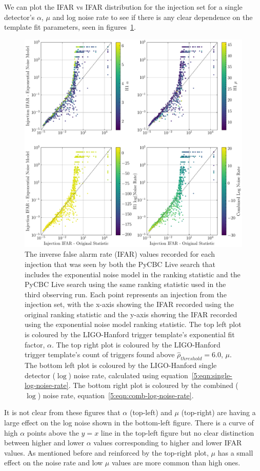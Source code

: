 We can plot the IFAR vs IFAR distribution for the injection set for a single detector's $\alpha$, $\mu$ and log noise rate to see if there is any clear dependence on the template fit parameters, seen in figures~\ref{5:fig:ifar-ifar-subplots}.
%
\begin{figure}
    \centering
    \includegraphics[width=\textwidth]{images/5_pycbclive/fits-only/fits_only_ifar_vs_ifar_subplots.pdf}
    \caption{The inverse false alarm rate (IFAR) values recorded for each injection that was seen by both the PyCBC Live search that includes the exponential noise model in the ranking statistic and the PyCBC Live search using the same ranking statistic used in the third observing run. Each point represents an injection from the injection set, with the x-axis showing the IFAR recorded using the original ranking statistic and the y-axis showing the IFAR recorded using the exponential noise model ranking statistic. The top left plot is coloured by the LIGO-Hanford trigger template's exponential fit factor, $\alpha$. The top right plot is coloured by the LIGO-Hanford trigger template's count of triggers found above $\hat{\rho}_{threshold} = 6.0$, $\mu$. The bottom left plot is coloured by the LIGO-Hanford single detector ($\log$) noise rate, calculated using equation~\ref{5:eqn:single-log-noise-rate}. The bottom right plot is coloured by the combined ($\log$) noise rate, equation~\ref{5:eqn:comb-log-noise-rate}.}
    \label{5:fig:ifar-ifar-subplots}
\end{figure}
%
It is not clear from these figures that $\alpha$ (top-left) and $\mu$ (top-right) are having a large effect on the log noise shown in the bottom-left figure. There is a curve of high $\alpha$ points above the $y=x$ line in the top-left figure but no clear distinction between higher and lower $\alpha$ values corresponding to higher and lower IFAR values. As mentioned before and reinforced by the top-right plot, $\mu$ has a small effect on the noise rate and low $\mu$ values are more common than high ones.

